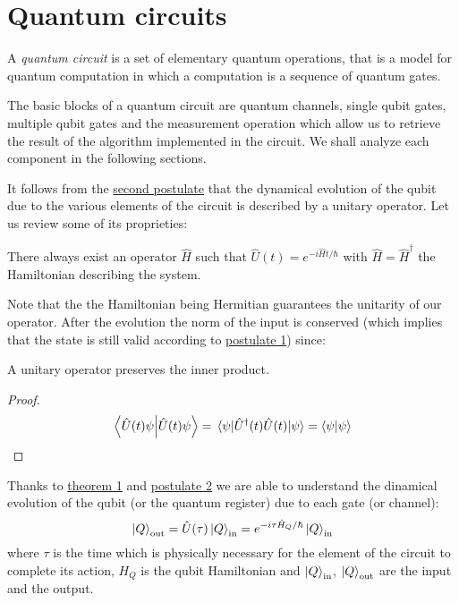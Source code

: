 \section{Quantum circuits}
A \emph{quantum circuit} is a set of elementary quantum operations, that is a model for quantum computation in which a computation is a sequence of quantum gates.

The basic blocks of a quantum circuit are quantum channels, single qubit gates, multiple qubit gates and the measurement operation which allow us to retrieve the result of the algorithm implemented in the circuit. We shall analyze each component in the following sections.

It follows from the \hyperref[postulate:2]{second postulate} that the dynamical evolution of the qubit due to the various elements of the circuit is described by a unitary operator. Let us review some of its proprieties: 
\begin{theorem}\label{theorem:1}
There always exist an operator $\hat{H}$ such that $\hat{U}(t) = e^{-i\hat{H}t/\hbar}$ with $\hat{H} = \hat{H}^\dagger$ the Hamiltonian describing the system. \cite[p.145]{Shankar}
\end{theorem}

Note that the the Hamiltonian being Hermitian guarantees the unitarity of our operator. After the evolution the norm of the input is conserved (which implies that the state is still valid according to \hyperref[postulate:1]{postulate 1}) since:
\begin{theorem}
A unitary operator preserves the inner product.
\end{theorem}
\begin{proof}
\begin{equation*}
    \bra{\hat{U}(t)\psi}\ket{\hat{U}(t)\psi} = \expval{\hat{U}^\dagger(t)\hat{U}(t)}{\psi} = \braket{\psi}
\end{equation*}
\end{proof}

Thanks to \hyperref[theorem:1]{theorem 1} and \hyperref[postulate:2]{postulate 2} we are able to understand the dinamical evolution of the qubit (or the quantum register) due to each gate (or channel):
\begin{equation}\label{eq:evolution}
     \ket{Q}_\textup{out} = \hat{U}(\tau) \ket{Q}_\textup{in} = e^{-i\tau\hat{H}_Q/\hbar} \ket{Q}_\textup{in}
\end{equation}
where $\tau$ is the time which is physically necessary for the element of the circuit to complete its action, $H_Q$ is the qubit Hamiltonian and $\ket{Q}_\textup{in}$, $\ket{Q}_\textup{out}$ are the input and the output.
